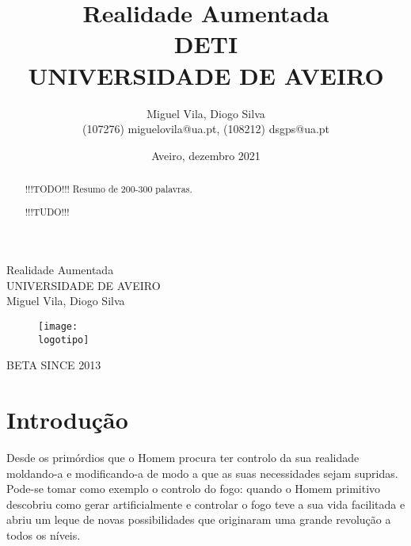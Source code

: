 \documentclass{report}
\begin{document}
\def\titulo{Realidade Aumentada}
\def\data{Aveiro, dezembro 2021}
\def\autores{Miguel Vila, Diogo Silva}
\def\autorescontactos{(107276) miguelovila@ua.pt, (108212) dsgps@ua.pt}
\def\versao{BETA SINCE 2013}
\def\departamento{DETI}
\def\empresa{UNIVERSIDADE DE AVEIRO}
\def\logotipo{ua.pdf}

\begin{titlepage}
\begin{center}
\vspace*{50mm}
{\Huge \titulo}\\ 
\vspace{10mm}
{\Large \empresa}\\
\vspace{10mm}
{\LARGE \autores}\\ 
\vspace{30mm}
\begin{figure}[h]
\center
\texttt{[image: \\logotipo]}
\end{figure}
\vspace{30mm}
\end{center}
\begin{flushright}
\versao
\end{flushright}
\end{titlepage}

\title{%
{\Huge\textbf{\titulo}}\\
{\Large \departamento\\ \empresa}
}
\author{
    \autores \\
    \autorescontactos
}
\date{\data}
\maketitle
{}

\begin{abstract}
!!!TODO!!! Resumo de 200-300 palavras.
\end{abstract}

\renewcommand{\abstractname}{Agradecimentos}
\begin{abstract}
!!!TUDO!!!
\end{abstract}

\tableofcontents

\clearpage
{}

\chapter{Introdução}
\label{chap.introducao}
Desde os primórdios que o Homem procura ter controlo da sua realidade moldando-a e modificando-a de modo a que as suas necessidades sejam supridas. Pode-se tomar como exemplo o controlo do fogo: quando o Homem primitivo descobriu como gerar artificialmente e controlar o fogo teve a sua vida facilitada e abriu um leque de novas possibilidades que originaram uma grande revolução a todos os níveis.
\end{document}
